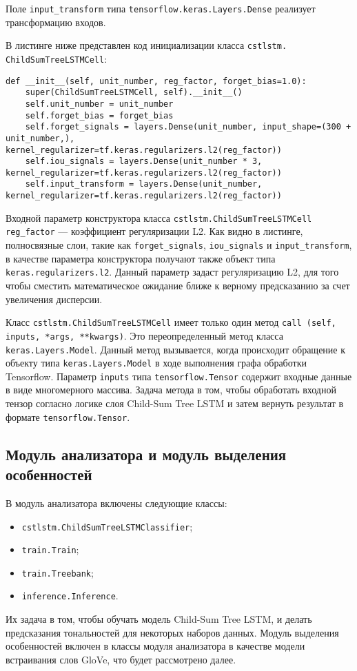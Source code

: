Поле \texttt{input\_transform} типа \texttt{tensorflow.keras.Layers.De\-nse} реализует трансформацию входов.

В листинге ниже представлен код инициализации класса \texttt{cstlstm.} \texttt{ChildSumTreeLSTMCell}:

\medskip
\begin{lstlisting}[style=Python]
  def __init__(self, unit_number, reg_factor, forget_bias=1.0):
    super(ChildSumTreeLSTMCell, self).__init__()
    self.unit_number = unit_number
    self.forget_bias = forget_bias
    self.forget_signals = layers.Dense(unit_number, input_shape=(300 + unit_number,), kernel_regularizer=tf.keras.regularizers.l2(reg_factor))
    self.iou_signals = layers.Dense(unit_number * 3, kernel_regularizer=tf.keras.regularizers.l2(reg_factor))
    self.input_transform = layers.Dense(unit_number, kernel_regularizer=tf.keras.regularizers.l2(reg_factor))
\end{lstlisting}
\medskip

Входной параметр конструктора класса \texttt{cstlstm.ChildSumTree\-LSTM\-Cell} \texttt{reg\_factor} --- коэффициент регуляризации L2. Как видно в листинге, полносвязные слои, такие как \texttt{forget\_signals}, \texttt{iou\_signals} и \texttt{input\_trans\-form}, в качестве параметра конструктора получают также объект типа \texttt{ke\-ras.regularizers.l2}. Данный параметр задаст регуляризацию L2, для того чтобы сместить математическое ожидание ближе к верному предсказанию за счет увеличения дисперсии.

Класс \texttt{cstlstm.ChildSumTreeLSTMCell} имеет только один метод \texttt{call (self, inputs, *args, **kwargs)}. Это переопределенный метод класса \texttt{keras.Layers.Model}. Данный метод вызывается, когда происходит обращение к объекту типа \texttt{keras.Layers.Model} в ходе выполнения графа обработки Tensorflow. Параметр \texttt{inputs} типа \texttt{tensorflow.Te\-nsor} содержит входные данные в виде многомерного массива. Задача метода в том, чтобы обработать входной тензор согласно логике слоя Child-Sum Tree LSTM и затем вернуть результат в формате \texttt{tensorflow.Tensor}.

\subsection{Модуль анализатора и модуль выделения особенностей}
В модуль анализатора включены следующие классы:
\begin{itemize}
\item \texttt{cstlstm.ChildSumTreeLSTMClassifier};
\item \texttt{train.Train};
\item \texttt{train.Treebank};
\item \texttt{inference.Inference}.
\end{itemize}
Их задача в том, чтобы обучать модель Child-Sum Tree LSTM, и делать предсказания тональностей для некоторых наборов данных. Модуль выделения особенностей включен в классы модуля анализатора в качестве модели встраивания слов GloVe, что будет рассмотрено далее.

